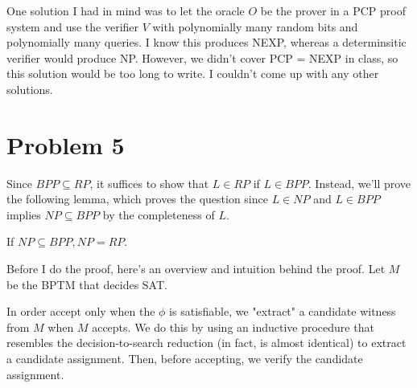 \documentclass[usletter]{article}
\begin{document}
One solution I had in mind was to let the
oracle $O$ be the prover in a PCP proof system
and use the verifier $V$ with polynomially many
random bits and polynomially many queries. I know
this produces NEXP, whereas a determinsitic verifier
would produce NP. However, we didn't cover PCP = NEXP
in class, so this solution would be too long to write.
I couldn't come up with any other solutions.

\newpage

\section*{Problem 5}

Since $BPP \subseteq RP$, it suffices to show that $L \in RP$
if $L \in BPP$. Instead, we'll prove the following lemma,
which proves the question since $L \in NP$ and $L \in BPP$ 
implies $NP \subseteq BPP$ by the completeness of $L$.

\begin{lemma}
    If $NP \subseteq BPP, NP = RP$.
\end{lemma}

Before I do the proof, here's an overview and intuition
behind the proof. Let $M$ be the BPTM that decides SAT.

In order accept only when the $\phi$ is
satisfiable, we "extract" a candidate witness from $M$
when $M$ accepts. We do this by using an inductive procedure
that resembles the decision-to-search reduction (in fact,
is almost identical) to extract a candidate assignment.
Then, before accepting, we verify the candidate assignment.
\end{document}
